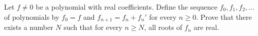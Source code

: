 Let \( f \ne 0\) be a polynomial with real coefficients. Define the sequence \( f_{0}, f_{1}, f_{2}, \ldots\) of polynomials by \( f_{0}= f\) and \( f_{n+1}= f_{n}+f_{n}'\) for every \( n \ge 0\). Prove that there exists a number \( N\) such that for every \( n \ge N\), all roots of \( f_{n}\) are real.